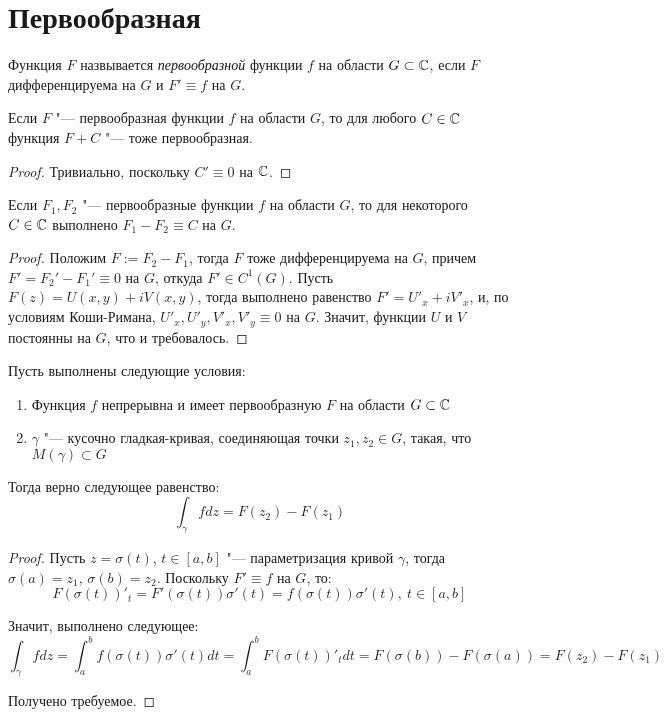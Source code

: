 \section{Первообразная}

\begin{definition}
	Функция $F$ назвывается \textit{первообразной} функции $f$ на области $G \subset \mathbb{C}$, если $F$ дифференцируема на $G$ и $F' \equiv f$ на $G$.
\end{definition}

\begin{note}
	Если $F$ "--- первообразная функции $f$ на области $G$, то для любого $C \in \mathbb{C}$ функция $F + C$ "--- тоже первообразная.
\end{note}

\begin{proof}
	Тривиально, поскольку $C' \equiv 0$ на $\mathbb{C}$.
\end{proof}

\begin{proposition}
	Если $F_1, F_2$ "--- первообразные функции $f$ на области $G$, то для некоторого $C \in \mathbb{C}$ выполнено $F_1 - F_2 \equiv C$ на $G$.
\end{proposition}

\begin{proof}
	Положим $F := F_2 - F_1$, тогда $F$ тоже дифференцируема на $G$, причем $F' = F_2' - F_1' \equiv 0$ на $G$, откуда $F' \in C^1(G)$. Пусть $F(z) = U(x, y) + iV(x, y)$, тогда выполнено равенство $F' = U'_x +iV'_x$, и, по условиям Коши-Римана, $U'_x, U'_y, V'_x, V'_y \equiv 0$ на $G$. Значит, функции $U$ и $V$ постоянны на $G$, что и требовалось.
\end{proof}

\begin{proposition}
	Пусть выполнены следующие условия:
	\begin{enumerate}
		\item Функция $f$ непрерывна и имеет первообразную $F$ на области $G \subset \mathbb{C}$
		\item $\gamma$ "--- кусочно гладкая-кривая, соединяющая точки $z_1, z_2 \in G$, такая, что $M(\gamma) \subset G$
	\end{enumerate}
	
	Тогда верно следующее равенство:
	\[\int_{\gamma}fdz = F(z_2) - F(z_1)\]
\end{proposition}

\begin{proof}
	Пусть $z = \sigma(t)$, $t \in [a, b]$ "--- параметризация кривой $\gamma$, тогда $\sigma(a) = z_1$, $\sigma(b) = z_2$. Поскольку $F' \equiv f$ на $G$, то:
	\[F(\sigma(t))'_t = F'(\sigma(t))\sigma'(t) = f(\sigma(t))\sigma'(t),~t \in [a, b]\]
	
	Значит, выполнено следующее:
	\[\int_\gamma fdz = \int_a^b f(\sigma(t))\sigma'(t)dt = \int_a^b F(\sigma(t))'_t dt = F(\sigma(b)) - F(\sigma(a)) = F(z_2) - F(z_1)\]
	
	Получено требуемое.
\end{proof}

